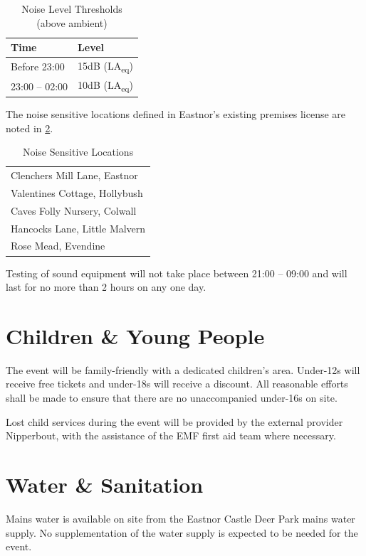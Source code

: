 \begin{table}[h!]
    \caption{Noise Level Thresholds (above ambient)}
    \label{table:noisethresholds}
    \centering
    \begin{tabular}{| l l |}
        \hline
        \textbf{Time}  & \textbf{Level}              \\
        \hline
        Before 23:00   & 15dB (LA\textsubscript{eq}) \\
        23:00 -- 02:00 & 10dB (LA\textsubscript{eq}) \\
        \hline
    \end{tabular}
\end{table}


The noise sensitive locations defined in Eastnor's existing premises license
are noted in \cref{table:noiselocations}.

\begin{table}[h!]
    \caption{Noise Sensitive Locations}
    \label{table:noiselocations}
    \centering
    \begin{tabular}{| l |}
        \hline
        Clenchers Mill Lane, Eastnor  \\
        Valentines Cottage, Hollybush \\
        Caves Folly Nursery, Colwall  \\
        Hancocks Lane, Little Malvern \\
        Rose Mead, Evendine           \\
        \hline
    \end{tabular}
\end{table}

Testing of sound equipment will not take place between 21:00 -- 09:00 and
will last for no more than 2 hours on any one day.

\section{Children \& Young People}

The event will be family-friendly with a dedicated children's area. Under-12s will receive free
tickets and under-18s will receive a discount. All reasonable efforts shall be made to ensure
that there are no unaccompanied under-16s on site.

Lost child services during the event will be provided by the external provider Nipperbout, with the
assistance of the EMF first aid team where necessary.

\section{Water \& Sanitation}\label{water}
Mains water is available on site from the Eastnor Castle Deer Park mains water supply. No
supplementation of the water supply is expected to be needed for the event.

